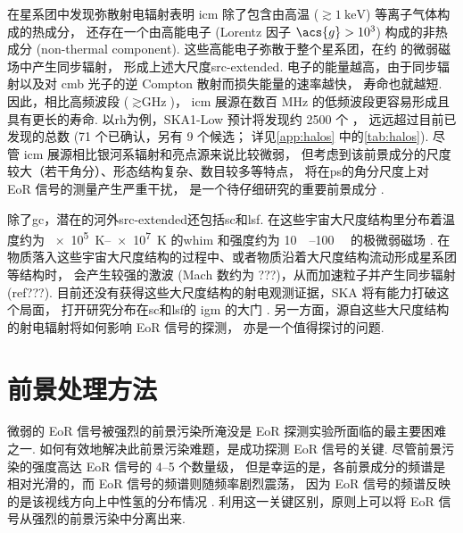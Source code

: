 在星系团中发现弥散射电辐射表明
\ac{icm} 除了包含由高温 ($\gtrsim \SI{1}{\keV}$) 等离子气体构成的热成分，
还存在一个由高能电子 (Lorentz 因子 $\acs{g} > \num{e3}$) 构成的非热成分
(non-thermal component).
这些高能电子弥散于整个星系团，在约 \si{\uG} 的微弱磁场中产生同步辐射，
形成上述大尺度\ac{src-extended}.
电子的能量越高，由于同步辐射以及对 \ac{cmb} 光子的逆 Compton 散射而损失能量的速率越快，
寿命也就越短.
因此，相比高频波段 ($\gtrsim\si{\GHz}$)，
\ac{icm} 展源在数百 MHz 的低频波段更容易形成且具有更长的寿命.
以\ac{rh}为例，SKA1-Low 预计将发现约 2500 个 \cite{cassano2015}，
远远超过目前已发现的总数 (71 个已确认，另有 9 个候选；
详见\autoref{app:halos} 中的\autoref{tab:halos}).
尽管 \ac{icm} 展源相比银河系辐射和亮点源来说比较微弱，
但考虑到该前景成分的尺度较大（若干角分）、形态结构复杂、数目较多等特点，
将在\ac{ps}的角分尺度上对 EoR 信号的测量产生严重干扰，
是一个待仔细研究的重要前景成分 \cite{diMatteo2004,gleser2008}.

除了\ac{gc}，潜在的河外\ac{src-extended}还包括\ac{sc}和\ac{lsf}.
在这些宇宙大尺度结构里分布着温度约为 \SIrange{e5}{e7}{\kelvin} 的\ac{whim}
和强度约为 \SIrange{10}{100}{\nano\gauss} 的极微弱磁场 \cite{vazza2015}.
在物质落入这些宇宙大尺度结构的过程中、或者物质沿着大尺度结构流动形成星系团等结构时，
会产生较强的激波 (Mach 数约为 ???)，从而加速粒子并产生同步辐射 (ref???).
目前还没有获得这些大尺度结构的射电观测证据，SKA 将有能力打破这个局面，
打开研究分布在\ac{sc}和\ac{lsf}的 \ac{igm} 的大门 \cite{vazza2015}.
另一方面，源自这些大尺度结构的射电辐射将如何影响 EoR 信号的探测，
亦是一个值得探讨的问题.


\section{前景处理方法}
\label{sec:fg-methods}

微弱的 EoR 信号被强烈的前景污染所淹没是 EoR 探测实验所面临的最主要困难之一.
如何有效地解决此前景污染难题，是成功探测 EoR 信号的关键.
尽管前景污染的强度高达 EoR 信号的 \numrange{4}{5} 个数量级，
但是幸运的是，各前景成分的频谱是相对光滑的，而 EoR 信号的频谱则随频率剧烈震荡，
因为 EoR 信号的频谱反映的是该视线方向上中性氢的分布情况
\cite{diMatteo2002,oh2003,gnedin2004}.
利用这一关键区别，原则上可以将 EoR 信号从强烈的前景污染中分离出来.

